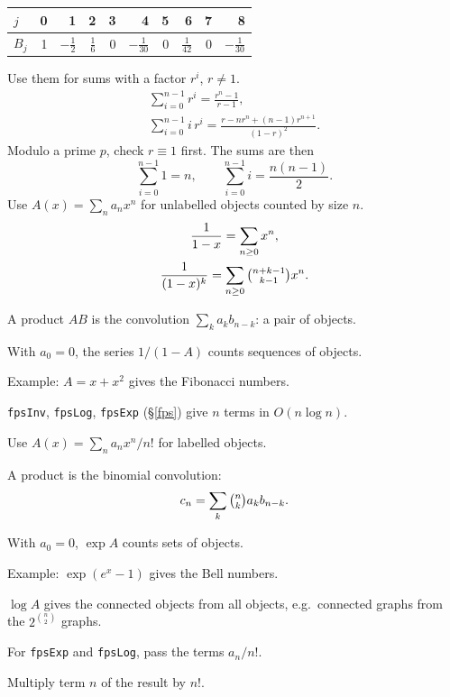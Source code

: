 {\begin{tabular}{@{}lrrrrrrrrr@{}}
\toprule
$j$ & 0 & 1 & 2 & 3 & 4 & 5 & 6 & 7 & 8 \\
\midrule
$B_j$ & 1 & $-\frac{1}{2}$ & $\frac{1}{6}$ & 0 & $-\frac{1}{30}$ & 0 & $\frac{1}{42}$ & 0 & $-\frac{1}{30}$ \\
\bottomrule
\end{tabular}
Use them for sums with a factor $r^i$, $r \ne 1$.
\begin{gather*} \sum_{i=0}^{n-1} r^i = \frac{r^n - 1}{r - 1}, \\ \sum_{i=0}^{n-1} i\, r^i = \frac{r - n r^n + (n-1) r^{n+1}}{(1 - r)^2}. \end{gather*}
Modulo a prime $p$, check $r \equiv 1$ first. The sums are then
\[ \sum_{i=0}^{n-1} 1 = n, \qquad \sum_{i=0}^{n-1} i = \frac{n(n-1)}{2}. \]
Use $A(x) = \sum_n a_n x^n$ for unlabelled objects counted by size $n$.
\begin{gather*} \frac{1}{1-x} = \sum_{n \ge 0} x^n, \\ \frac{1}{(1-x)^k} = \sum_{n \ge 0} \tbinom{n+k-1}{k-1} x^n. \end{gather*}
\begin{facts}
	\item A product $A B$ is the convolution $\sum_{k} a_k b_{n-k}$: a pair of objects.
	\item With $a_0 = 0$, the series $1/(1 - A)$ counts sequences of objects.
	\item Example: $A = x + x^2$ gives the Fibonacci numbers.
	\item \texttt{fpsInv}, \texttt{fpsLog}, \texttt{fpsExp} (\S\ref{fps}) give $n$ terms in $O(n \log n)$.
\end{facts}
Use $A(x) = \sum_n a_n x^n / n!$ for labelled objects.
\begin{facts}
	\item A product is the binomial convolution:
	\[ c_n = \sum_k \tbinom{n}{k} a_k b_{n-k}. \]
	\item With $a_0 = 0$, $\exp A$ counts sets of objects.
	\item Example: $\exp(e^x - 1)$ gives the Bell numbers.
	\item $\log A$ gives the connected objects from all objects, e.g.\ connected graphs from the $2^{\binom{n}{2}}$ graphs.
	\item For \texttt{fpsExp} and \texttt{fpsLog}, pass the terms $a_n / n!$.
	\item Multiply term $n$ of the result by $n!$.

\end{facts}}
